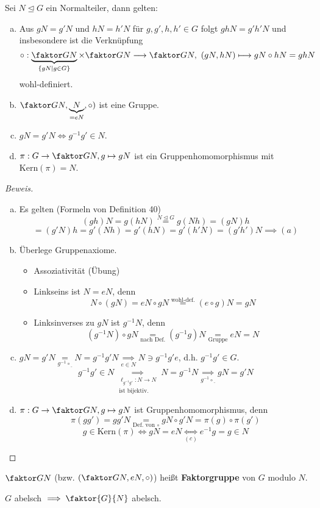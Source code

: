\documentclass[a4paper]{report}
\begin{document}
\begin{satz}
  Sei $N \trianglelefteq G$ ein Normalteiler, dann gelten:
  \begin{enumerate}[(a)]
    \item Aus $gN = g'N$ und $hN = h'N$ für $g, g', h, h' \in G$ folgt $ghN = g'h'N$ und insbesondere ist die Verknüpfung $$\circ : \underbrace{\faktor GN}_{\{gN \mid g \in G\}} \times \faktor GN \longrightarrow \faktor GN,\  (gN, hN) \longmapsto gN \circ hN = ghN$$
          wohl-definiert.
    \item $\faktor GN, \underbrace{N}_{=eN}, \circ)$ ist eine Gruppe.
    \item $gN = g'N \iff g^{-1}g' \in N$.
    \item $\pi : G \to \faktor GN, g \mapsto gN$ ist ein Gruppenhomomorphismus mit $\mathrm{Kern}(\pi) = N$.
  \end{enumerate}
\begin{proof}[Beweis]
\begin{enumerate}[(a)]
  \item Es gelten (Formeln von Definition 40)
        $$(gh)N = g(hN) \overset{N \trianglelefteq G}= g(Nh) = (gN)h$$
        $$= (g'N)h = g'(Nh) = g'(hN) = g'(h'N) = (g'h')N \implies (a)$$
  \item Überlege Gruppenaxiome.
\begin{itemize}
  \item Assoziativität (Übung)
  \item Linkseins ist $N = eN$, denn
        $$N \circ(gN) = eN\circ gN \overset{\text{wohl-def.}} = (e \circ g)N = gN$$
  \item Linksinverses zu $gN$ ist $g^{-1}N$, denn
        $$(g^{-1}N)\circ gN \underset{\text{nach Def.}}= (g^{-1}g)N \underset{\text{Gruppe}}= eN = N$$
\end{itemize}
  \item  $gN = g'N \underset{g^{-1}\circ \underline{\ }}= N = g^{-1}g'N \underset{e \in N}\implies N \ni g^{-1}g'e$, d.h. $g^{-1}g' \in G$.
        $$g^{-1}g' \in N \underset{\substack{\ell_{g^{-1}g'} : N \to N\\ \text{ist bijektiv.}}}\implies N = g^{-1}N \underset{g^{-1}\circ \underline{\ }}\implies gN= g'N$$
  \item $\pi : G \to \faktor GN, g \mapsto gN$ ist Gruppenhomomorphismus, denn $$\pi(gg') = gg'N \underset{\text{Def. von } \circ} = gN \circ g'N = \pi(g)\circ \pi(g')$$
        $$g \in \mathrm{Kern}(\pi) \iff gN = eN \underset{(c)}\iff e^{-1}g = g \in N$$
\end{enumerate}
\end{proof}
\end{satz}
\begin{bem*}[Bezeichnung] $\faktor GN$ (bzw. $(\faktor GN, eN, \circ)$) heißt \textbf{Faktorgruppe} von $G$ modulo $N$.
\end{bem*}
\begin{bem*}[Übung]
$G$ abelsch $\implies \faktor{G}{N}$ abelsch.
\end{bem*}
\end{document}
